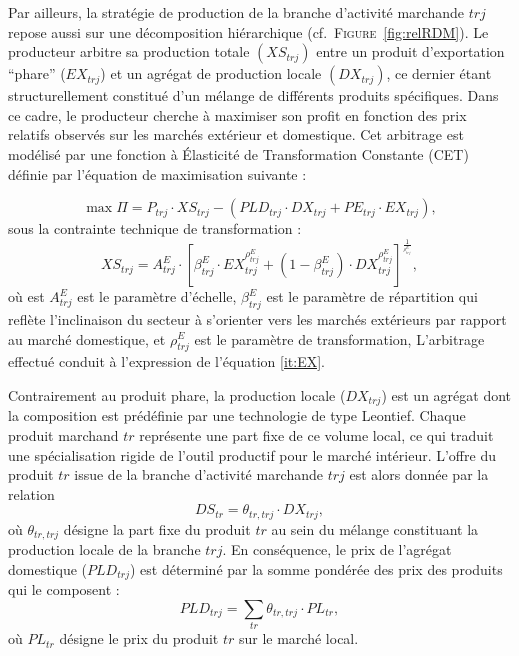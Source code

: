 \documentclass[11pt,a4paper]{article}
\newcommand{\tr}{\mathit{tr}}
\newcommand{\trj}{\mathit{trj}}
\newcommand{\DS}{\mathit{DS}}
\newcommand{\DX}{\mathit{DX}}
\newcommand{\EX}{\mathit{EX}}
\newcommand{\PE}{\mathit{PE}}
\newcommand{\PL}{\mathit{PL}}
\newcommand{\PLD}{\mathit{PLD}}
\newcommand{\XS}{\mathit{XS}}
\begin{document}
	\begin{figure}[!htbp]
		\centering
		
	\end{figure}
	
	Par ailleurs, la stratégie de production de la branche d'activité marchande $\trj$ repose aussi sur une décomposition hiérarchique (cf.~\textsc{Figure}~\ref{fig:relRDM}). Le producteur arbitre sa production totale $\left(\XS_{\trj}\right)$ entre un produit d'exportation ``phare'' ($\EX_{\trj}$) et un agrégat de production locale $\left(\DX_{\trj}\right)$, ce dernier étant structurellement constitué d'un mélange de différents produits spécifiques. Dans ce cadre, le producteur cherche à maximiser son profit en fonction des prix relatifs observés sur les marchés extérieur et domestique. Cet arbitrage est modélisé par une fonction à {Élasticité de Transformation Constante (CET)} définie par l'équation de maximisation suivante :
	
	\begin{equation*}
		\max \Pi = P_{\trj} \cdot \XS_{\trj} - \left( \PLD_{\trj} \cdot \DX_{\trj} + \PE_{\trj} \cdot \EX_{\trj} \right),
	\end{equation*}
	sous la contrainte technique de transformation :
	\begin{equation*}
		\XS_{\trj} = A_{\trj}^E \cdot \left[\beta_{\trj}^E\cdot\EX_{\trj}^{\rho_{\trj}^E} + \left(1 - \beta_{\trj}^E\right)\cdot \DX_{\trj}^{\rho_{\trj}^E}\right]^{\frac{1}{^{\rho_{\trj}^E}}},
	\end{equation*}
	où est $A_{\trj}^E$ est le paramètre d'échelle, $\beta_{\trj}^E$ est le paramètre de répartition qui reflète l'inclinaison du secteur à s'orienter vers les marchés extérieurs par rapport au marché domestique, et $\rho_{\trj}^E$ est le paramètre de transformation,
	L'arbitrage effectué conduit à l'expression de l'équation \ref{it:EX}.
	
	Contrairement au produit phare, la production locale ($\DX_{\trj}$) est un agrégat dont la composition est prédéfinie par une technologie de type Leontief. Chaque produit marchand $\tr$ représente une part fixe de ce volume local, ce qui traduit une spécialisation rigide de l'outil productif pour le marché intérieur. L'offre du produit $\tr$ issue de la branche d'activité marchande $\trj$ est alors donnée par la relation
	\begin{equation*}
		\DS_{\tr} = \theta_{\tr, \trj} \cdot \DX_{\trj},
	\end{equation*}
	où $\theta_{\tr, \trj}$ désigne la part fixe du produit $\tr$ au sein du mélange constituant la production locale de la branche $\trj$. En conséquence, le prix de l'agrégat domestique ($\PLD_{\trj}$) est déterminé par la somme pondérée des prix des produits qui le composent :
	\begin{equation*}
		\PLD_{\trj} = \sum_{\tr} \theta_{\tr, \trj} \cdot \PL_{\tr},
	\end{equation*}
	où $\PL_{\tr}$ désigne le prix du produit $\tr$ sur le marché local. 
	
\end{document}

